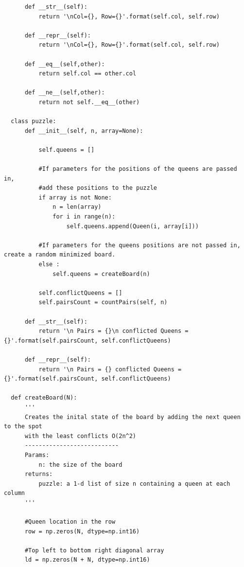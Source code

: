 \documentclass{article}
\begin{document}
\begin{verbatim}    
      def __str__(self):
          return '\nCol={}, Row={}'.format(self.col, self.row)

      def __repr__(self):
          return '\nCol={}, Row={}'.format(self.col, self.row)

      def __eq__(self,other): 
          return self.col == other.col
  
      def __ne__(self,other):
          return not self.__eq__(other)
  
  class puzzle: 
      def __init__(self, n, array=None): 
      
          self.queens = []
  
          #If parameters for the positions of the queens are passed in, 
          #add these positions to the puzzle        
          if array is not None:
              n = len(array)
              for i in range(n): 
                  self.queens.append(Queen(i, array[i]))
  
          #If parameters for the queens positions are not passed in, create a random minimized board.
          else : 
              self.queens = createBoard(n)
  
          self.conflictQueens = []
          self.pairsCount = countPairs(self, n)
          
      def __str__(self):
          return '\n Pairs = {}\n conflicted Queens = {}'.format(self.pairsCount, self.conflictQueens)
  
      def __repr__(self):
          return '\n Pairs = {} conflicted Queens = {}'.format(self.pairsCount, self.conflictQueens)
    
  def createBoard(N):
      '''
      Creates the inital state of the board by adding the next queen to the spot 
      with the least conflicts O(2n^2)
      ---------------------------
      Params:
          n: the size of the board
      returns:
          puzzle: a 1-d list of size n containing a queen at each column
      '''
  
      #Queen location in the row
      row = np.zeros(N, dtype=np.int16)
  
      #Top left to bottom right diagonal array
      ld = np.zeros(N + N, dtype=np.int16)
  \end{verbatim}
\newpage
\end{document}
